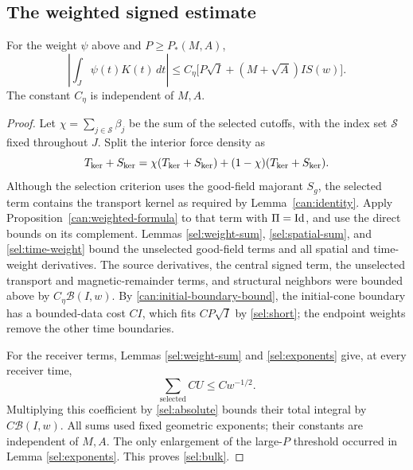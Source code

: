 \subsection{The weighted signed estimate}

\begin{proposition}\label{sel:bulk-impulse}
For the weight $\psi$ above and $P\ge P_*(M,A)$,
\begin{equation}\label{sel:bulk}
 \left|\int_J\psi(t)K(t)\,dt\right|
 \le C_\eta\big[P\sqrt I+(M+\sqrt A)I S(w)\big].
\end{equation}
The constant $C_\eta$ is independent of $M,A$.
\end{proposition}

\begin{proof}
Let $\chi=\sum_{j\in\mathcal S}\beta_j$ be the sum of the selected
cutoffs, with the index set $\mathcal S$ fixed throughout $J$. Split the
interior force density as
\[
 T_{\rm ker}+S_{\rm ker}
 =\chi(T_{\rm ker}+S_{\rm ker})
      +(1-\chi)(T_{\rm ker}+S_{\rm ker}).
\]
Although the selection criterion uses the good-field majorant $S_g$,
the selected term contains the transport kernel as required by
Lemma~\ref{can:identity}. Apply Proposition~\ref{can:weighted-formula}
to that term with $\Pi=\mathrm{Id}$, and use the direct bounds on its
complement. Lemmas \ref{sel:weight-sum},
\ref{sel:spatial-sum}, and \ref{sel:time-weight} bound the unselected
good-field terms and all spatial and time-weight derivatives. The
source derivatives, the central signed term, the unselected transport
and magnetic-remainder terms, and structural neighbors were bounded above by
$C_\eta\mathcal B(I,w)$. By \eqref{can:initial-boundary-bound}, the initial-cone boundary has a bounded-data
cost $CI$, which fits $CP\sqrt I$ by \eqref{sel:short}; the endpoint
weights remove the other time boundaries.

For the receiver terms, Lemmas \ref{sel:weight-sum} and
\ref{sel:exponents} give, at every receiver time,
\[
 \sum_{\mathrm{selected}}CU\le Cw^{-1/2}.
\]
Multiplying this coefficient by \eqref{sel:absolute} bounds their total
integral by $C\mathcal B(I,w)$. All sums used fixed geometric exponents;
their constants are independent of $M,A$. The only enlargement of the
large-$P$ threshold occurred in Lemma \ref{sel:exponents}. This proves
\eqref{sel:bulk}.
\end{proof}
